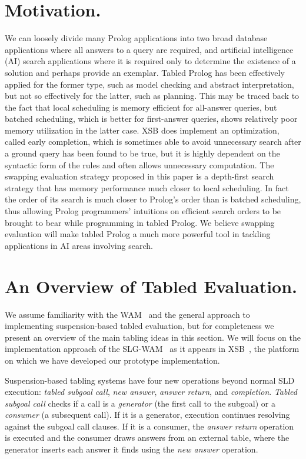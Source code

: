 \documentclass{./tlp}
\renewcommand{\mnote}[1]{}
\newcommand{\redsect}{\vspace{-1em}}
\begin{document}
\redsect
\section{Motivation.}
\label{sec:motivation}

\mnote{Reviewer 1 comment} We can loosely divide many Prolog applications into two broad
 database applications where
all answers to a query are required, and artificial intelligence (AI)
search applications where it is required only to determine the
existence of a solution and perhaps provide an exemplar.  Tabled
Prolog has been effectively applied for the former type, such
as model checking and abstract interpretation, but not so effectively
for the latter, such as planning.  This may be traced back to the fact
that local scheduling is memory efficient for all-answer queries, but
batched scheduling, which is better for first-answer queries, shows
relatively poor memory utilization in the latter case.  XSB does
implement an optimization, called early completion, which is sometimes
able to avoid unnecessary search after a ground query has been found
to be true, but it is highly dependent on the syntactic form of the
rules and often allows unnecessary computation.  The swapping
evaluation strategy proposed in this paper is a depth-first search
strategy that has memory performance much closer to local scheduling.
In fact the order of its search is much closer to Prolog's order than
is batched scheduling, thus allowing Prolog programmers' intuitions on
efficient search orders to be brought to bear while programming in
tabled Prolog.  We believe swapping evaluation will make tabled Prolog
a much more powerful tool in tackling applications in AI areas
involving search.

\redsect\redsect
\section{An Overview of Tabled Evaluation.}
\label{sec:overview}

We assume familiarity with the WAM~\cite{hassan-wamtutorial} and
the general approach to implementing suspension-based tabled
evaluation, but for completeness we present an overview of 
the main tabling ideas in this section. We will focus on the
implementation approach of the 
SLG-WAM~\cite{sagonas98:xsb-abstract-machine} 
as it appears in XSB~\cite{xsb}, the platform on which we have developed
our prototype implementation.

Suspension-based tabling systems have four new operations beyond
normal SLD execution: \emph{tabled subgoal call}, \emph{new answer},
\emph{answer return}, and \emph{completion}.  \emph{Tabled subgoal
  call} checks if a call is a \emph{generator} (the first call to the subgoal) or a \emph{consumer} (a subsequent call).
If it is a generator, execution continues resolving against the
subgoal call clauses.  If it is a consumer, the \emph{answer return}
operation is executed and the consumer draws answers from an external
table, where the generator inserts each answer it finds using the
\emph{ new answer} operation.  
\end{document}

